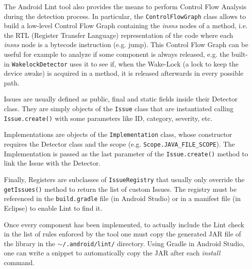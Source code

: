 \documentclass[11pt,a4paper,notitlepage]{article}
\begin{document}
The Android Lint tool also provides the means to perform Control Flow Analysis during the detection process. In particular, the \texttt{ControlFlowGraph} class allows to build a low-level Control Flow Graph containing the \textit{insns} nodes of a method, i.e. the RTL (Register Transfer Language) representation of the code where each \textit{insns} node is a bytecode instruction (e.g. jump). This Control Flow Graph can be useful for example to analyze if some component is always released, e.g. the built-in \texttt{WakelockDetector} uses it to see if, when the Wake-Lock (a lock to keep the device awake) is acquired in a method, it is released afterwards in every possible path.

Issues are usually defined as public, final and static fields inside their Detector class. They are simply objects of the \texttt{Issue} class that are instantiated calling \texttt{Issue.create()} with some parameters like ID, category, severity, etc.

Implementations are objects of the \texttt{Implementation} class, whose constructor requires the Detector class and the scope (e.g. \texttt{Scope.JAVA\_FILE\_SCOPE}). The Implementation is passed as the last parameter of the \texttt{Issue.create()} method to link the Issue with the Detector.

Finally, Registers are subclasses of \texttt{IssueRegistry} that usually only override the \texttt{getIssues()} method to return the list of custom Issues. The registry must be referenced in the \texttt{build.gradle} file (in Android Studio) or in a manifest file (in Eclipse) to enable Lint to find it.

Once every component has been implemented, to actually include the Lint check in the list of rules enforced by the tool one must copy the generated JAR file of the library in the \texttt{$\sim$/.android/lint/} directory. Using Gradle in Android Studio, one can write a snippet to automatically copy the JAR after each \textit{install} command.
\end{document}
